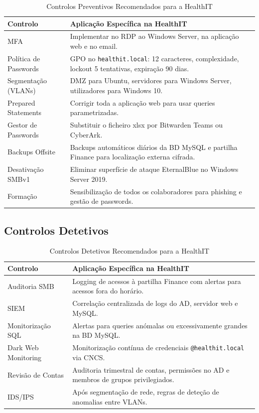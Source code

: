 \documentclass[12pt, a4paper]{report}
\newcommand{\thead}[1]{\bfseries\small\color{white}#1}
\begin{document}
\begin{table}[H]
\centering
\caption{Controlos Preventivos Recomendados para a HealthIT}
\begin{tabularx}{\linewidth}{l X}
\toprule
\rowcolor{TableHead}
\thead{Controlo} & \thead{Aplicação Específica na HealthIT} \\
\midrule
MFA & Implementar no RDP ao Windows Server, na aplicação web e no email. \\
\rowcolor{TableAlt}
Política de Passwords & GPO no \texttt{healthit.local}: 12 caracteres, complexidade, lockout 5 tentativas, expiração 90 dias. \\
Segmentação (VLANs) & DMZ para Ubuntu, servidores para Windows Server, utilizadores para Windows 10. \\
\rowcolor{TableAlt}
Prepared Statements & Corrigir toda a aplicação web para usar queries parametrizadas. \\
Gestor de Passwords & Substituir o ficheiro xlsx por Bitwarden Teams ou CyberArk. \\
\rowcolor{TableAlt}
Backups Offsite & Backups automáticos diários da BD MySQL e partilha Finance para localização externa cifrada. \\
Desativação SMBv1 & Eliminar superfície de ataque EternalBlue no Windows Server 2019. \\
\rowcolor{TableAlt}
Formação & Sensibilização de todos os colaboradores para phishing e gestão de passwords. \\
\bottomrule
\end{tabularx}
\end{table}

\subsection{Controlos Detetivos}

\begin{table}[H]
\centering
\caption{Controlos Detetivos Recomendados para a HealthIT}
\begin{tabularx}{\linewidth}{l X}
\toprule
\rowcolor{TableHead}
\thead{Controlo} & \thead{Aplicação Específica na HealthIT} \\
\midrule
Auditoria SMB & Logging de acessos à partilha Finance com alertas para acessos fora do horário. \\
\rowcolor{TableAlt}
SIEM & Correlação centralizada de logs do AD, servidor web e MySQL. \\
Monitorização SQL & Alertas para queries anómalas ou excessivamente grandes na BD MySQL. \\
\rowcolor{TableAlt}
Dark Web Monitoring & Monitorização contínua de credenciais \texttt{@healthit.local} via CNCS. \\
Revisão de Contas & Auditoria trimestral de contas, permissões no AD e membros de grupos privilegiados. \\
\rowcolor{TableAlt}
IDS/IPS & Após segmentação de rede, regras de deteção de anomalias entre VLANs. \\
\bottomrule
\end{tabularx}
\end{table}
\end{document}
